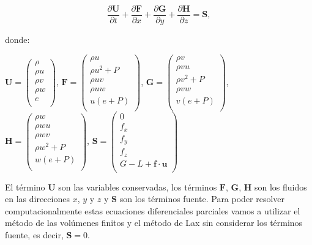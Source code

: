 \documentclass[12pt,a4paper]{book}
\begin{document}
\begin{equation} \label{euler_cartesianas}
\dfrac{\partial \mathbf{U}}{\partial t}+\dfrac{\partial \mathbf{F}}{\partial x}+\dfrac{\partial \mathbf{G}}{\partial y}+\dfrac{\partial \mathbf{H}}{\partial z}= \mathbf{S}  ,
\end{equation}

\noindent donde:
\begin{center}


$\mathbf{U}=
\left(\begin{smallmatrix}
\rho \\
\rho u \\
\rho v \\
\rho w \\
e \\
\end{smallmatrix}\right)
$,
$\mathbf{F} =
\left(\begin{smallmatrix}
\rho u \\
\rho u^{2}+P \\
\rho uv \\
\rho uw \\
u(e+P) \\
\end{smallmatrix}\right)
$,
$\mathbf{G} =
\left(\begin{smallmatrix}
\rho v\\
\rho vu \\
\rho v^{2}+P \\
\rho vw \\
v(e+P) \\
\end{smallmatrix}\right)
$,
$\mathbf{H} =
\left(\begin{smallmatrix}
\rho w\\
\rho wu \\
\rho wv \\
\rho w^{2}+P \\
w(e+P) \\
\end{smallmatrix}\right)
$, 
$\mathbf{S} =
\left(\begin{smallmatrix}
0 \\
f_{x} \\
f_{y} \\
f_{z} \\
G-L+\textbf{f} \cdot \textbf{u} \\
\end{smallmatrix}\right)
$
\end{center}

El término $\mathbf{U}$ son las variables conservadas, los términos $\mathbf{F}$, $\mathbf{G}$, $\mathbf{H}$ son los fluidos en las direcciones $x$, $y$ y $z$ y $\mathbf{S}$ son los términos fuente. 
Para poder resolver computacionalmente estas ecuaciones diferenciales parciales vamos a utilizar el método de las volúmenes finitos y el método de Lax sin considerar los términos fuente, es decir, 
$\mathbf{S}=0$.
\end{document}
